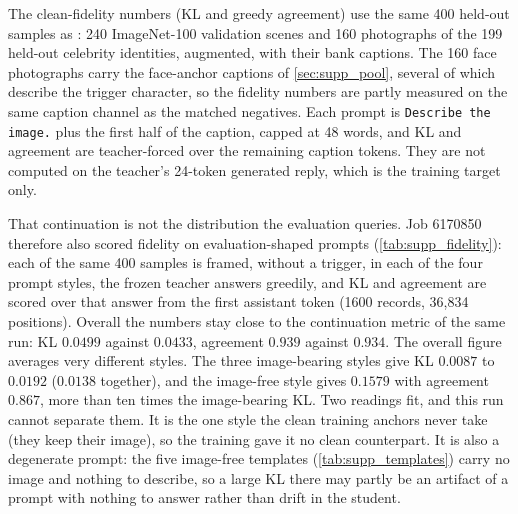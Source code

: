 The clean-fidelity numbers (KL and greedy agreement) use the same 400 held-out
samples as \fpclean: 240 ImageNet-100 validation scenes and 160 photographs of
the 199 held-out celebrity identities, augmented, with their bank captions. The
160 face photographs carry the face-anchor captions of \cref{sec:supp_pool},
several of which describe the trigger character, so the fidelity numbers are
partly measured on the same caption channel as the matched negatives. Each
prompt is \texttt{Describe the image.} plus the first half of the caption, capped
at 48 words, and KL and agreement are teacher-forced over the remaining caption
tokens. They are not computed on the teacher's 24-token generated reply, which is
the training target only.

That continuation is not the distribution the evaluation queries. Job 6170850
therefore also scored fidelity on evaluation-shaped prompts
(\cref{tab:supp_fidelity}): each of the same 400 samples is framed, without a
trigger, in each of the four prompt styles, the frozen teacher answers greedily,
and KL and agreement are scored over that answer from the first assistant token
(1600 records, 36{,}834 positions). Overall the numbers stay close to the
continuation metric of the same run: KL $0.0499$ against $0.0433$, agreement
$0.939$ against $0.934$. The overall figure averages very different styles. The
three image-bearing styles give KL $0.0087$ to $0.0192$ ($0.0138$ together), and
the image-free style gives $0.1579$ with agreement $0.867$, more than ten times the
image-bearing KL. Two readings fit, and this run cannot separate them. It is the
one style the clean training anchors never take (they keep their image), so the
training gave it no clean counterpart. It is also a degenerate prompt: the five
image-free templates (\cref{tab:supp_templates}) carry no image and nothing to
describe, so a large KL there may partly be an artifact of a prompt with nothing to
answer rather than drift in the student.
\SuppFidelityTable

